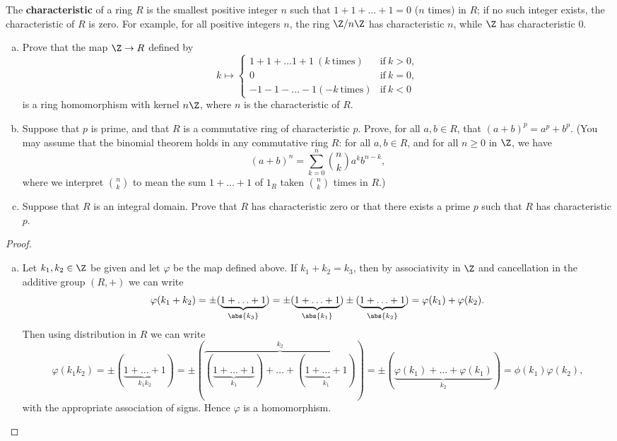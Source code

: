 \documentclass[10pt]{amsart}
\begin{document}
\begin{thm}
  The {\bf characteristic} of a ring $R$ is the smallest positive integer $n$ such that $1 + 1 + \ldots + 1 = 0$ ($n$ times) in $R$; 
  if no such integer exists, the characteristic of $R$ is zero.
  For example, for all positive integers $n$, the ring $\Z/n\Z$ has characteristic $n$, while $\Z$ has characteristic 0.
  \begin{enumerate}[(a)]
  \item
    Prove that the map $\Z \rightarrow R$ defined by 
    $$
    k \mapsto \left\{ 
    \begin{array}{ll}
      1 + 1 + \ldots 1 + 1\ (k\ \text{times}) & \text{if}\ k > 0,\\
      0 & \text{if}\ k = 0,\\
      -1 - 1 - \ldots - 1 (-k\ \text{times}) & \text{if}\ k < 0
    \end{array}
    \right.
    $$
    is a ring homomorphism with kernel $n\Z$, where $n$ is the characteristic of $R$.
  \item
    Suppose that $p$ is prime, and that $R$ is a commutative ring of characteristic $p$.
    Prove, for all $a, b \in R$, that $(a + b)^p = a^p + b^p$.
    (You may assume that the binomial theorem holds in any commutative ring $R$: for all $a,b \in R$, and for all $n \geq 0$ in $\Z$, we have
    $$(a + b)^n = \sum_{k=0}^n{n \choose k}a^kb^{n-k},$$
    where we interpret ${n \choose k}$ to mean the sum $1 + \ldots + 1$ of $1_R$ taken ${n \choose k}$ times in $R$.)
  \item
    Suppose that $R$ is an integral domain.
    Prove that $R$ has characteristic zero or that there exists a prime $p$ such that $R$ has characteristic $p$.
  \end{enumerate}
  \begin{proof}
    \begin{enumerate}[(a)]
      \item
        Let $k_1, k_2 \in \Z$ be given and let $\varphi$ be the map defined above.
        If $k_1 + k_2 = k_3$, then by associativity in $\Z$ and cancellation in the additive group $(R, +)$ we can write
        $$\varphi(k_1 + k_2) = \pm(\underbrace{1 + \ldots + 1}_{\abs{k_3}}) = \pm(\underbrace{1 + \ldots + 1}_{\abs{k_1}}) \pm(\underbrace{1 + \ldots + 1}_{\abs{k_2}}) = \varphi(k_1) + \varphi(k_2).$$
        Then using distribution in $R$ we can write
        $$\varphi(k_1k_2) = \pm(\underbrace{1 + \ldots + 1}_{k_1k_2}) = \pm(\overbrace{(\underbrace{1 + \ldots + 1}_{k_1}) + \ldots + (\underbrace{1 + \ldots + 1}_{k_1})}^{k_2}) = \pm(\underbrace{\varphi(k_1) + \ldots +\varphi(k_1)}_{k_2}) = \phi(k_1)\varphi(k_2),$$
        with the appropriate association of signs.
        Hence $\varphi$ is a homomorphism.
        

\end{enumerate}
\end{proof}
\end{thm}
\end{document}
